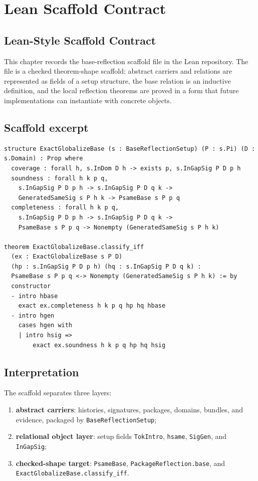 \chapter{Lean Scaffold Contract}
\label{ch:proof-obligations-lean-scaffold-contract}

\section{Lean-Style Scaffold Contract}
\label{sec:po-lean-scaffold-contract}

This chapter records the base-reflection scaffold file in the Lean repository. The file is a checked theorem-shape scaffold: abstract carriers and relations are represented as fields of a setup structure, the base relation is an inductive definition, and the local reflection theorems are proved in a form that future implementations can instantiate with concrete objects.

\section{Scaffold excerpt}
\begin{lstlisting}[language={}]
structure ExactGlobalizeBase (s : BaseReflectionSetup) (P : s.Pi) (D : s.Domain) : Prop where
  coverage : forall h, s.InDom D h -> exists p, s.InGapSig P D p h
  soundness : forall h k p q,
    s.InGapSig P D p h -> s.InGapSig P D q k ->
    GeneratedSameSig s P h k -> PsameBase s P p q
  completeness : forall h k p q,
    s.InGapSig P D p h -> s.InGapSig P D q k ->
    PsameBase s P p q -> Nonempty (GeneratedSameSig s P h k)

theorem ExactGlobalizeBase.classify_iff
  (ex : ExactGlobalizeBase s P D)
  (hp : s.InGapSig P D p h) (hq : s.InGapSig P D q k) :
  PsameBase s P p q <-> Nonempty (GeneratedSameSig s P h k) := by
  constructor
  - intro hbase
    exact ex.completeness h k p q hp hq hbase
  - intro hgen
    cases hgen with
    | intro hsig =>
        exact ex.soundness h k p q hp hq hsig
\end{lstlisting}

\section{Interpretation}
The scaffold separates three layers:
\begin{enumerate}
  \item \textbf{abstract carriers}: histories, signatures, packages, domains, bundles, and evidence, packaged by \texttt{BaseReflectionSetup};
  \item \textbf{relational object layer}: setup fields \texttt{TokIntro}, \texttt{hsame}, \texttt{SigGen}, and \texttt{InGapSig};
  \item \textbf{checked-shape target}: \texttt{PsameBase}, \texttt{PackageReflection.base}, and \texttt{ExactGlobalizeBase.classify\_iff}.
\end{enumerate}

